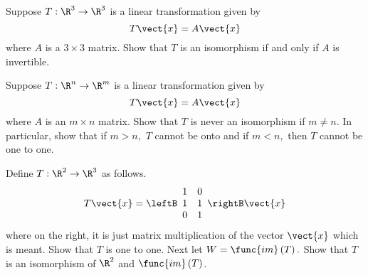 \begin{enumialphparenastyle}
\begin{ex} Suppose $T:\R^{3}\rightarrow \R^{3}$ is a linear
transformation given by 
\begin{equation*}
T\vect{x}=A\vect{x}
\end{equation*}
where $A$ is a $3\times 3$ matrix. Show that $T$ is an isomorphism if and
only if $A$ is invertible.
\end{ex}


\begin{ex} Suppose $T:\R^{n}\rightarrow \R^{m}$ is a linear
transformation given by 
\begin{equation*}
T\vect{x}=A\vect{x}
\end{equation*}
where $A$ is an $m\times n$ matrix. Show that $T$ is never an isomorphism if 
$m\neq n$. In particular, show that if $m>n,$ $T$ cannot be onto and if $
m<n, $ then $T$ cannot be one to one.
\end{ex}


\begin{ex} Define $T:\R^{2}\rightarrow \R^{3}$ as follows. 
\begin{equation*}
T\vect{x}=\leftB 
\begin{array}{cc}
1 & 0 \\ 
1 & 1 \\ 
0 & 1
\end{array}
\rightB \vect{x}
\end{equation*}
where on the right, it is just matrix multiplication of the vector $\vect{x}$
which is meant. Show that $T$ is one to one. Next let $W=\func{im}\left(
T\right) .$ Show that $T$ is an isomorphism of $\R^{2}$ and $\func{im
}\left( T\right) $.
\end{ex}



\end{enumialphparenastyle}
